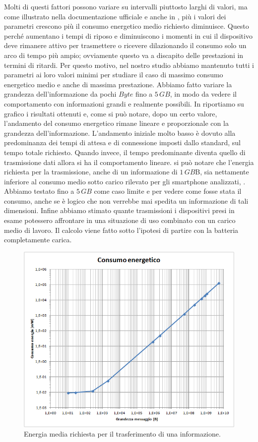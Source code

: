 Molti di questi fattori possono variare su intervalli piuttosto larghi di valori, ma come illustrato nella documentazione ufficiale \cite{BT-CoreSpec4.0} e anche in \cite{sensor2012}, più i valori dei parametri crescono più il consumo energetico medio richiesto diminuisce. Questo perché aumentano i tempi di riposo e diminuiscono i momenti in cui il dispositivo deve rimanere attivo per trasmettere o ricevere dilazionando il consumo solo un arco di tempo più ampio; ovviamente questo va a discapito delle prestazioni in termini di ritardi. Per questo motivo, nel nostro studio abbiamo mantenuto tutti i parametri ai loro valori minimi per studiare il caso di massimo consumo energetico medio e anche di massima prestazione. Abbiamo fatto variare la grandezza dell'informazione da pochi $Byte$ fino a $5\,GB$, in modo da vedere il comportamento con informazioni grandi e realmente possibili. In  riportiamo su grafico i risultati ottenuti e, come si può notare, dopo un certo valore, l'andamento del consumo energetico rimane lineare e proporzionale con la grandezza dell'informazione. L'andamento iniziale molto basso è dovuto alla predominanza dei tempi di attesa e di connessione imposti dallo standard, sul tempo totale richiesto. Quando invece, il tempo predominante diventa quello di trasmissione dati allora si ha il comportamento lineare. si può notare che l'energia richiesta per la trasmissione, anche di un informazione di $1\,GB$B, sia nettamente inferiore al consumo medio sotto carico rilevato per gli smartphone analizzati, . Abbiamo testato fino a $5\,GB$ come caso limite e per vedere come fosse stata il consumo, anche se è logico che non verrebbe mai spedita un informazione di tali dimensioni. Infine abbiamo stimato quante trasmissioni i dispositivi presi in esame potessero affrontare in una situazione di uso combinato con un carico medio di lavoro. Il calcolo viene fatto sotto l'ipotesi di partire con la batteria completamente carica.
\begin{figure}[t]
	\centering
	\includegraphics[width=0.8\linewidth]{Images/studio_energetico/cons_en_sing_tx_02}
	\caption[Studio energetico BLE singola trasmissione]{Energia media richiesta per il trasferimento di una informazione.}
	\label{fig:cons_en_sing_tx_02}
\end{figure}

